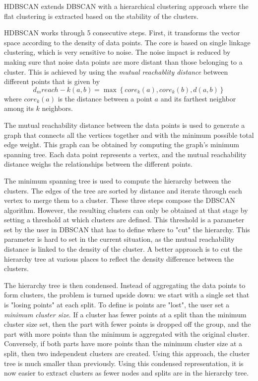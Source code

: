HDBSCAN extends DBSCAN with a hierarchical clustering approach where the flat clustering is extracted based on the stability of the clusters.

HDBSCAN works through 5 consecutive steps.
First, it transforms the vector space according to the density of data points.
The core is based on single linkage clustering, which is very sensitive to noise.
The noise impact is reduced by making sure that noise data points are more distant than those belonging to a cluster.
This is achieved by using the \textit{mutual reachablity distance} between different points
that is given by
\[d_mreach-k (a,b) = \max \left\{core_k (a),core_k (b),d(a,b)\right\}\]
where \(core_k(a)\) is the distance between a point \(a\) and its farthest neighbor among
its \(k\) neighbors.

The mutual reachability distance between the data points is used to generate a graph that connects all the vertices together and with the minimum possible total edge weight.
This graph can be obtained by computing the graph's minimum spanning tree.
Each data point represents a vertex, and the mutual reachability distance weighs the relationships between the different points.

The minimum spanning tree is used to compute the hierarchy between the clusters.
The edges of the tree are sorted by distance and iterate through each vertex to merge them to a cluster.
These three steps compose the DBSCAN algorithm.
However, the resulting clusters can only be obtained at that stage by setting a threshold at which clusters are defined.
This threshold is a parameter set by the user in DBSCAN that has to define where to "cut" the hierarchy.
This parameter is hard to set in the current situation, as the mutual reachability distance is linked to the density of the cluster.
A better approach is to cut the hierarchy tree at various places to reflect the density difference between the clusters.

The hierarchy tree is then condensed.
Instead of aggregating the data points to form clusters, the problem is turned upside down: we start with a single set that is "losing points" at each split.
To define is points are "lost", the user set a \textit{minimum cluster size}.
If a cluster has fewer points at a split than the minimum cluster size set, then the part with fewer points is dropped off the group, and the part with more points than the minimum is aggregated with the original cluster.
Conversely, if both parts have more points than the minimum cluster size at a split, then two independent clusters are created.
Using this approach, the cluster tree is much smaller than previously.
Using this condensed representation, it is now easier to extract clusters as fewer nodes and splits are in the hierarchy tree.

